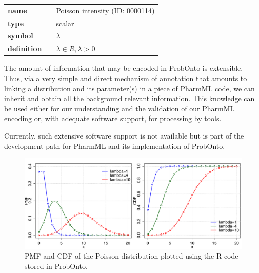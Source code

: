 {\noindent\begin{tabular}{p{2cm}cl}
\textbf{name} & & Poisson intensity  (ID: 0000114) \\
\textbf{type} & & scalar \\
\textbf{symbol} & & $\lambda$  \\
\textbf{definition} & & $\lambda \in R, \lambda > 0$
\end{tabular}
\bigskip 

The amount of information that may be encoded in ProbOnto is extensible. 
Thus,  via a very simple and direct mechanism of annotation that amounts to 
linking a distribution and its parameter(s) in a piece of PharmML code, we can
 inherit and obtain all the background relevant information. 
 This knowledge can be used either for our understanding and the validation of 
 our PharmML encoding or, with adequate software support, for processing by 
 tools. 
 
Currently, such extensive software support is not available but is part of the 
development path for PharmML and its implementation of ProbOnto. 

\begin{figure}[htb!]
\centering
  \includegraphics[width=120mm]{pics/Poisson.pdf}
 \caption{PMF and CDF of the Poisson distribution plotted using the R-code
 stored in ProbOnto.}
 \label{fig:PoissonExample}
\end{figure}

}
